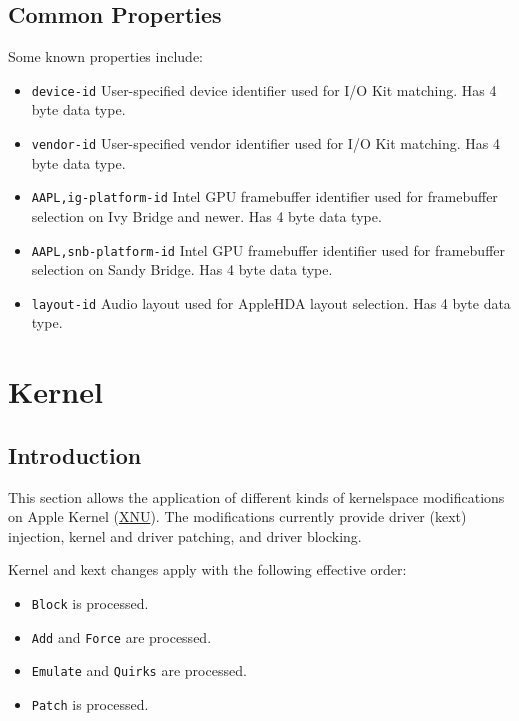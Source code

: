 \documentclass[]{article}
\providecommand{\tightlist}{%
  \setlength{\itemsep}{0pt}\setlength{\parskip}{0pt}}
\begin{document}
\subsection{Common Properties}\label{devpropscommon}

Some known properties include:

\begin{itemize}
\tightlist
\item
  \texttt{device-id}
  \break
  User-specified device identifier used for I/O Kit matching. Has 4 byte data type.
\item
  \texttt{vendor-id}
  \break
  User-specified vendor identifier used for I/O Kit matching. Has 4 byte data type.
\item
  \texttt{AAPL,ig-platform-id}
  \break
  Intel GPU framebuffer identifier used for framebuffer selection on Ivy Bridge and newer.
  Has 4 byte data type.
\item
  \texttt{AAPL,snb-platform-id}
  \break
  Intel GPU framebuffer identifier used for framebuffer selection on Sandy Bridge.
  Has 4 byte data type.
\item
  \texttt{layout-id}
  \break
  Audio layout used for AppleHDA layout selection. Has 4 byte data type.
\end{itemize}


\section{Kernel}\label{kernel}

\subsection{Introduction}\label{kernelintro}

This section allows the application of different kinds of kernelspace modifications on
Apple Kernel (\href{https://github.com/apple-oss-distributions/xnu}{XNU}). The modifications
currently provide driver (kext) injection, kernel and driver patching, and driver
blocking.

Kernel and kext changes apply with the following effective order:

\begin{itemize}
\tightlist
\item \texttt{Block} is processed.
\item \texttt{Add} and \texttt{Force} are processed.
\item \texttt{Emulate} and \texttt{Quirks} are processed.
\item \texttt{Patch} is processed.
\end{itemize}
\end{document}
